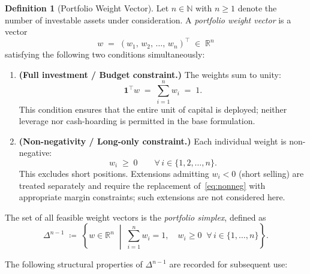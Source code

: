 \documentclass[12pt,openany]{book}
\newcommand{\R}{\mathbb{R}}
\newcommand{\N}{\mathbb{N}}
\newcommand{\bfw}{\mathbf{w}}
\newcommand{\bfone}{\mathbf{1}}
\numberwithin{equation}{chapter}
\theoremstyle{plain}
\theoremstyle{definition}
\newtheorem{definition}[theorem]{Definition}
\theoremstyle{remark}
\def\bfw{w}%
\begin{document}
\begin{definition}[Portfolio Weight Vector]
\label{def:weights}
Let $n \in \N$ with $n \geq 1$ denote the number of investable
assets under consideration.
A \emph{portfolio weight vector} is a vector
\begin{equation}
  \bfw \;=\; (w_1,\, w_2,\, \ldots,\, w_n)^\top \;\in\; \R^n
\end{equation}
satisfying the following two conditions simultaneously:
\begin{enumerate}[label=\textbf{(A\arabic*)}, leftmargin=*, widest=A2]

  \item \textbf{(Full investment / Budget constraint.)}
        The weights sum to unity:
        \begin{equation}
          \bfone^\top \bfw
          \;=\;
          \sum_{i=1}^{n} w_i
          \;=\; 1.
          \label{eq:budget}
        \end{equation}
        This condition ensures that the entire unit of capital
        is deployed; neither leverage nor cash-hoarding is
        permitted in the base formulation.

  \item \textbf{(Non-negativity / Long-only constraint.)}
        Each individual weight is non-negative:
        \begin{equation}
          w_i \;\geq\; 0
          \qquad \forall\, i \in \{1, 2, \ldots, n\}.
          \label{eq:nonneg}
        \end{equation}
        This excludes short positions.
        Extensions admitting $w_i < 0$ (short selling)
        are treated separately and require the replacement
        of~\eqref{eq:nonneg} with appropriate margin constraints;
        such extensions are not considered here.

\end{enumerate}

\noindent
The set of all feasible weight vectors is the
\emph{portfolio simplex}, defined as
\begin{equation}
  \Delta^{n-1}
  \;\coloneqq\;
  \left\{
    \bfw \in \R^n
    \;\middle|\;
    \sum_{i=1}^{n} w_i = 1,\quad
    w_i \geq 0 \;\;\forall\, i \in \{1,\ldots,n\}
  \right\}.
  \label{eq:simplex}
\end{equation}

\noindent
The following structural properties of $\Delta^{n-1}$
are recorded for subsequent use:
\begin{enumerate}[label=\textbf{(P\arabic*)}, leftmargin=*, widest=P3]


\end{enumerate}
\end{definition}
\end{document}
